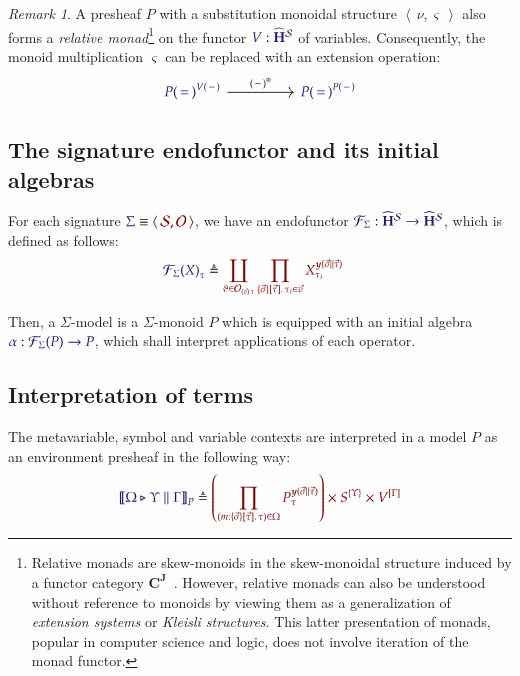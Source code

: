 \documentclass[11pt]{article}
\theoremstyle{definition}
\theoremstyle{remark}
\newtheorem{remark}[thm]{Remark}
\numberwithin{equation}{section}
\def\IModeColorName{MidnightBlue}
\def\OModeColorName{Maroon}
\newcommand\IMode[1]{{\color{\IModeColorName}{#1}}}
\newcommand\OMode[1]{{\color{\OModeColorName}{#1}}}
\newcommand\Of[2]{\IMode{#1}: \IMode{#2}}
\newcommand\MkValence[3]{%
  \ifthenelse{\equal{#1}{}}{}{%
    \{#1\}%
  }%
  \ifthenelse{\equal{#2}{}}{}{%
    [#2]%
  }.\, #3%
}
\newcommand\MkArity[2]{(#1)\, #2}
\newcommand\Match[2]{\IMode{#1}\equiv\OMode{#2}}
\newcommand\Sorts{\mathcal{S}}
\newcommand\Operators{\mathcal{O}}
\newcommand\HypCat{\mathbf{H}}
\newcommand\Pair[2]{\left\langle\,#1,#2\,\right\rangle}
\newcommand\Define[2]{\IMode{#1}\triangleq\OMode{#2}}
\newcommand\SigFun[1]{\mathcal{F}_{#1}}
\newcommand\SemBrackets[1]{\left\llbracket#1\right\rrbracket}
\newcommand\Yoneda[1]{\boldsymbol{y} (#1)}
\begin{document}
\begin{remark}
  A presheaf $P$ with a substitution monoidal structure $\Pair{\nu}{\varsigma}$
  also forms a \emph{relative monad}\footnote{Relative monads are skew-monoids
    in the skew-monoidal structure induced by a functor category
    $\mathbf{C}^\mathbf{J}$~\cite{altenkirch-chapman-uustalu:2015}. However,
    relative monads can also be understood without reference to monoids by
    viewing them as a generalization of \emph{extension systems} or
    \emph{Kleisli structures}. This latter presentation of monads, popular in
    computer science and logic, does not involve iteration of the monad
    functor.} on the functor $\Of{V}{\widehat{\HypCat}^\Sorts}$ of variables.
  Consequently, the monoid multiplication $\varsigma$ can be replaced with an
  extension operation:
  \[
    \begin{tikzcd}[ampersand replacement = \&, sep = huge]
      {\IMode{{P(\,=\,)}^{V(\,-\,)}}} \arrow[r, "{(\,-\,)}^{\circledast}"]
      \& {\IMode{{P(\,=\,)}^{P(\,-\,)}}}
    \end{tikzcd}
  \]
\end{remark}

\subsection{The signature endofunctor and its initial algebras}

For each signature $\Match{\Sigma}{\Pair{\Sorts}{\Operators}}$, we have an
endofunctor
$\Of{\SigFun{\Sigma}}{\widehat{\HypCat}^\Sorts\to\widehat{\HypCat}^\Sorts}$,
which is defined as follows:
\begin{align*}
  \IMode{{\SigFun{\Sigma}(X)}_{\tau}}
    &\triangleq
    \OMode{
      \coprod_{\vartheta\in \Operators_{\MkArity{\vec{v}}{\tau}}}
      \prod_{\MkValence{\vec{\sigma}}{\vec{\tau}}{\tau_i}\in\vec{v}}
      X_{\tau_i}^{\Yoneda{\vec{\sigma}\parallel\vec{\tau}}}
    }
\end{align*}

Then, a $\Sigma$-model is a $\Sigma$-monoid $P$ which is equipped with an initial
algebra $\Of{\alpha}{\SigFun{\Sigma}(P)\to P}$, which shall interpret
applications of each operator.

\subsection{Interpretation of terms}

The metavariable, symbol and variable contexts are interpreted in a model $P$ as an
environment presheaf in the following way:
\[
  \Define{
    \SemBrackets{
      \Omega\triangleright\Upsilon\parallel\Gamma
    }_P
  }{
    \left(\prod_{(m:\MkValence{\vec{\sigma}}{\vec{\tau}}{\tau})\in\Omega}P_{\tau}^{\Yoneda{\vec{\sigma}\parallel\vec{\tau}}}\right)
    \times
    S^{\{\Upsilon\}}
    \times
    V^{[\Gamma]}
  }
\]
\end{document}
